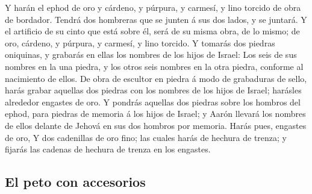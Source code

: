  Y harán el ephod de oro y cárdeno, y púrpura, y carmesí,
y lino torcido de obra de bordador.  Tendrá dos hombreras
que se junten á sus dos lados, y se juntará.  Y el
artificio de su cinto que está sobre él, será de su misma obra, de lo
mismo; de oro, cárdeno, y púrpura, y carmesí, y lino torcido.
 Y tomarás dos piedras oniquinas, y grabarás en ellas los
nombres de los hijos de Israel:  Los seis de sus nombres
en la una piedra, y los otros seis nombres en la otra piedra, conforme
al nacimiento de ellos.  De obra de escultor en piedra á
modo de grabaduras de sello, harás grabar aquellas dos piedras con los
nombres de los hijos de Israel; harásles alrededor engastes de oro.
 Y pondrás aquellas dos piedras sobre los hombros del
ephod, para piedras de memoria á los hijos de Israel; y Aarón llevará
los nombres de ellos delante de Jehová en sus dos hombros por memoria.
 Harás pues, engastes de oro,  Y dos
cadenillas de oro fino; las cuales harás de hechura de trenza; y fijarás
las cadenas de hechura de trenza en los engastes.

\hypertarget{el-peto-con-accesorios}{%
\subsection{El peto con accesorios}\label{el-peto-con-accesorios}}

